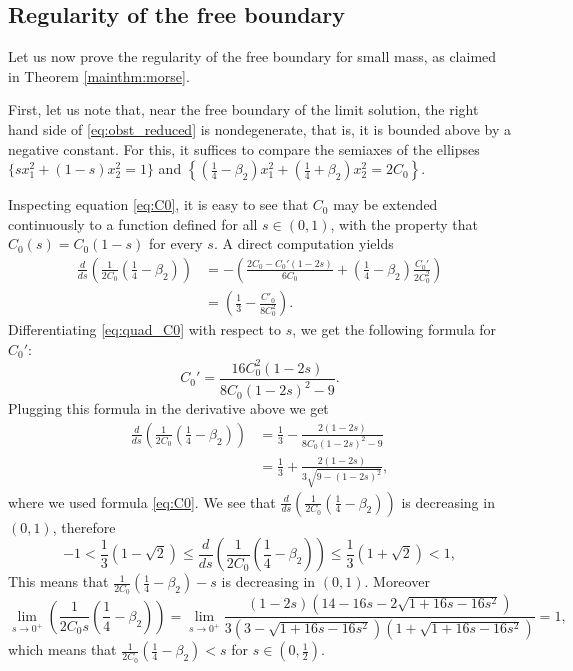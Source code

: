 \documentclass[10pt,a4paper]{article}
\numberwithin{equation}{section}
\begin{document}
\subsection{Regularity of the free boundary}

Let us now prove the regularity of the free boundary for small mass, as claimed in Theorem \ref{mainthm:morse}.

First, let us note that, near the free boundary of the limit solution, the right hand side of \eqref{eq:obst_reduced} is nondegenerate, that is, it is bounded above by a negative constant. For this, it suffices to compare the semiaxes of the ellipses $ \{ sx_1^2 + (1-s)x_2^2  = 1 \} $ and $ \left\{ \left( \frac14 - \beta_2\right) x_1^2 + \left( \frac14 + \beta_2 \right)x^2_2 = 2C_0 \right\}. $

Inspecting equation \eqref{eq:C0}, it is easy to see that $ C_0 $ may be extended continuously to a function defined for all $ s\in (0,1) $, with the property that $ C_0(s) = C_0(1-s) $ for every $ s $. A direct computation yields
\begin{align*}
	\frac{d}{ds}\left( \frac{1}{2C_0} \left(\frac14 - \beta_2\right) \right) &= - \left( \frac{2C_0 - C_0' (1-2s)}{6C_0} +\left(\frac14 - \beta_2\right) \frac{C_0'}{2C_0^2} \right) \\
										 &=\left( \frac{1}{3} - \frac{C'_0}{8C_0^{2}} \right). 
\end{align*}
Differentiating \eqref{eq:quad_C0} with respect to $ s $, we get the following formula for $ C_0' $:
\[C_0' = \frac{16C_0^2(1-2s)}{8C_0(1-2s)^2 - 9}.\]
Plugging this formula in the derivative above we get
\begin{align*}
	\frac{d}{ds}\left( \frac{1}{2C_0} \left(\frac14 - \beta_2\right) \right) &= \frac{1}{3} - \frac{2 (1-2s)}{8C_0(1-2s)^2 - 9}\\
										 &= \frac{1}{3} + \frac{2(1-2s)}{3 \sqrt{9 - (1 - 2s)^2}},
\end{align*}
where we used formula \eqref{eq:C0}. We see that $ \frac{d}{ds}\left( \frac{1}{2C_0} \left(\frac14 - \beta_2\right) \right)$ is decreasing in $ (0,1) $, therefore
\[ -1 < \frac{1}{3} \left(1 - \sqrt{2}  \right) \leq\frac{d}{ds}\left( \frac{1}{2C_0} \left(\frac14 - \beta_2\right) \right) \leq \frac{1}{3} \left(1 + \sqrt{2}  \right) < 1 , \]
This means that $ \frac{1}{2C_0}\left( \frac14 -\beta_2\right) - s $ is decreasing in $ (0,1) $. Moreover
\[
\lim_{s\rightarrow 0^+}\left( \frac{1}{2C_0s} \left(\frac14 - \beta_2\right) \right) = \lim_{s\rightarrow 0^+} \frac{(1-2s) (14 - 16s - 2 \sqrt{1 + 16s - 16s^2})}{3(3 -\sqrt{1 + 16s - 16s^2}) (1 + \sqrt{1 + 16s - 16s^2})} = 1,
\]
which means that $ \frac{1}{2C_0} \left(\frac14 - \beta_2\right) < s$ for $ s \in (0,\frac12) $. 
\end{document}
